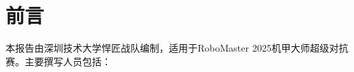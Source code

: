 \section*{前言}

    
    \noindent
    本报告由深圳技术大学悍匠战队编制，适用于RoboMaster 2025机甲大师超级对抗赛。主要撰写人员包括：
    
    \noindent
